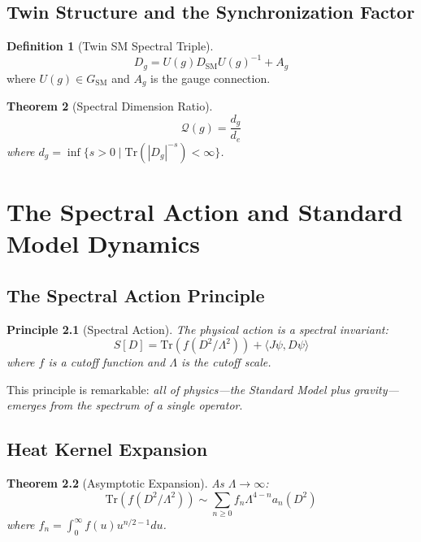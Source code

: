 \documentclass[11pt,a4paper,openright]{book}
\theoremstyle{plain}
\newtheorem{theorem}{Theorem}[chapter]
\newtheorem{principle}[theorem]{Principle}
\theoremstyle{definition}
\newtheorem{definition}[theorem]{Definition}
\newcommand{\SM}{\mathrm{SM}}
\newcommand{\Tr}{\mathrm{Tr}}
\newcommand{\Lam}{\Lambda}
\begin{document}
\section{Twin Structure and the Synchronization Factor}

\begin{definition}[Twin SM Spectral Triple]
\begin{equation}
D_g = U(g) D_{\SM} U(g)^{-1} + A_g
\end{equation}
where $U(g) \in G_{\SM}$ and $A_g$ is the gauge connection.
\end{definition}

\begin{theorem}[Spectral Dimension Ratio]
\begin{equation}
\mathcal{Q}(g) = \frac{d_g}{d_e}
\end{equation}
where $d_g = \inf\{s > 0 \mid \Tr(|D_g|^{-s}) < \infty\}$.
\end{theorem}

\chapter{The Spectral Action and Standard Model Dynamics}
\label{ch:spectral-action}

\section{The Spectral Action Principle}

\begin{principle}[Spectral Action]
The physical action is a spectral invariant:
\begin{equation}
S[D] = \Tr(f(D^2/\Lam^2)) + \langle J\psi, D\psi\rangle
\end{equation}
where $f$ is a cutoff function and $\Lam$ is the cutoff scale.
\end{principle}

This principle is remarkable: \emph{all of physics---the Standard Model plus gravity---emerges from the spectrum of a single operator}.

\section{Heat Kernel Expansion}

\begin{theorem}[Asymptotic Expansion]
As $\Lam \to \infty$:
\begin{equation}
\Tr(f(D^2/\Lam^2)) \sim \sum_{n \geq 0} f_n \Lam^{4-n} a_n(D^2)
\end{equation}
where $f_n = \int_0^\infty f(u) u^{n/2-1} du$.
\end{theorem}
\end{document}
